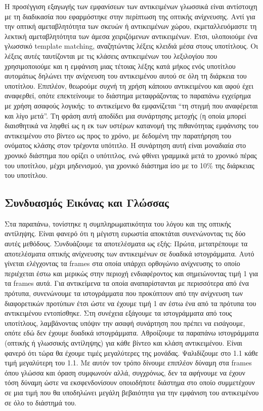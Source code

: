\documentclass[11pt,a4paper,english,greek,twoside]{../Thesis}
\begin{document}
\par Η προσέγγιση εξαγωγής των εμφανίσεων των αντικειμένων γλωσσικά είναι αντίστοιχη με τη διαδικασία που εφαρμόστηκε στην περίπτωση της οπτικής ανίχνευσης. Αντί για την οπτική αμεταβλητότητα των σκευών ή αντικειμένων χώρου, εκμεταλλευόμαστε τη λεκτική αμεταβλητότητα των άμεσα χειριζόμενων αντικειμένων. Έτσι, υλοποιούμε ένα γλωσσικό template matching, αναζητώντας λέξεις κλειδιά μέσα στους υποτίτλους. Οι λέξεις αυτές ταυτίζονται με τις κλάσεις αντικειμένων του λεξιλογίου που χρησιμοποιούμε και η εμφάνιση μιας τέτοιας λέξης κατά μήκος ενός υποτίτλου αυτομάτως δηλώνει την ανίχνευση του αντικειμένου αυτού σε όλη τη διάρκεια του υποτίτλου. Επιπλέον, θεωρούμε συχνή τη χρήση κάποιου αντικειμένου και αφού έχει αναφερθεί, οπότε επεκτείνουμε το διάστημα μεταφράζοντας το παραπάνω εγχείρημα με χρήση ασαφούς λογικής: το αντικείμενο θα εμφανίζεται “τη στιγμή που αναφέρεται και λίγο μετά”. Τη φράση αυτή αποδίδει μια συνάρτησης μετοχής (η οποία μπορεί διαισθητικά να ληφθεί ως η εκ των υστέρων κατανομή της πιθανότητας εμφάνισης του αντικειμένου στο βίντεο ως προς το χρόνο, με δεδομένη την παρατήρηση του ονόματος κλάσης στον τρέχοντα υπότιτλο. Η συνάρτηση αυτή είναι μοναδιαία στο χρονικό διάστημα που ορίζει ο υπότιτλος, ενώ φθίνει γραμμικά μετά το χρονικό πέρας του υποτίτλου, μέχρι μηδενισμού, για χρονικό διάστημα ίσο με το 10\% της διάρκειας του υποτίτλου.


\subsection{Συνδυασμός Εικόνας και Γλώσσας}
Στα παραπάνω, τονίστηκε η συμπληρωματικότητα του λόγου και της οπτικής αντίληψης. Είναι φανερό ότι η μέγιστη ευρωστία αποκτάται συνενώνοντας τις δύο αυτές μεθόδους. Συνδυάζουμε τα αποτελέσματα ως εξής: Πρώτα, μετατρέπουμε τα αποτελέσματα οπτικής ανίχνευσης των αντικειμένων σε δυαδικά ιστογράμματα. Αυτό γίνεται ελέγχοντας τα frames στα οποία υπάρχει ορθογώνιο ανίχνευσης το οποίο περιέχεται έστω και μερικώς στην περιοχή ενδιαφέροντος και σημειώνοντας τιμή 1 για τα frames αυτά. Για αντικείμενα τα οποία αναπαρίστανται με περισσότερα από ένα πρότυπα, συνενώνουμε τα ιστογράμματα που προκύπτουν από την ανίχνευση των διαφορετικών προτύπων έτσι ώστε να έχουμε τιμή 1 αν έστω ένα από τα πρότυπα του αντικειμένου εντοπίσθηκε. Στη συνέχεια εξάγουμε τα ιστογράμματα από τους υποτίτλους, λαμβάνοντας υπόψιν την ασαφή συνάρτηση που πρέπει να εισάγουμε, οπότε εδώ δεν έχουμε δυαδικά ιστογράμματα. Αθροίζουμε τα παραπάνω ιστογράμματα (οπτικής ή γλωσσικής αντίληψης) για κάθε βίντεο και κλάση αντικειμένου. Είναι φανερό ότι τώρα θα έχουμε τιμές μεγαλύτερες της μονάδας. Ψαλιδίζουμε στο 1.1 κάθε τιμή μεγαλύτερη του 1.1. Με αυτόν τον τρόπο δίνουμε επιπλέον δύναμη στα frames όπου γλώσσα και όραση συμφωνούν αλλά, συγχρόνως, δεν τα αφήνουμε να έχουν τόση δύναμη ώστε να εκσφενδονίσουν οποιοδήποτε διάστημα στο οποίο συμμετέχουν σε μια τιμή που θα υποδηλώνει μεγάλη βεβαιότητα για την εμφάνιση του αντικειμένου σε όλο το διάστημά του.
\end{document}
